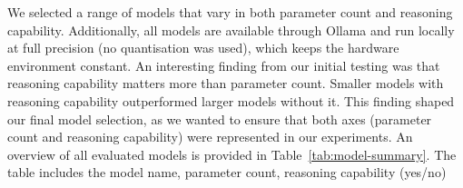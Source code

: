 


We selected a range of models that vary in both parameter count and reasoning capability. Additionally, all models are available through Ollama and run locally at full precision (no quantisation was used), which keeps the hardware environment constant. An interesting finding from our initial testing was that reasoning capability matters more than parameter count. Smaller models with reasoning capability outperformed larger models without it. This finding shaped our final model selection, as we wanted to ensure that both axes (parameter count and reasoning capability) were represented in our experiments. An overview of all evaluated models is provided in Table~\ref{tab:model-summary}. The table includes the model name, parameter count, reasoning capability (yes/no)






